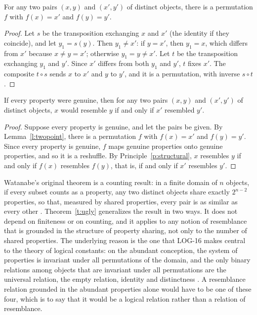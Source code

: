 \documentclass{situationist-preprint}
\begin{document}
\begin{lemma}\label{l:twopoint}
For any two pairs $(x,y)$ and $(x',y')$ of distinct objects, there is a permutation $f$ with $f(x) = x'$ and $f(y) = y'$.
\end{lemma}

\begin{proof}
Let $s$ be the transposition exchanging $x$ and $x'$ (the identity if they coincide), and let $y_1 = s(y)$. Then $y_1 \neq x'$: if $y = x'$, then $y_1 = x$, which differs from $x'$ because $x \neq y = x'$; otherwise $y_1 = y \neq x'$. Let $t$ be the transposition exchanging $y_1$ and $y'$. Since $x'$ differs from both $y_1$ and $y'$, $t$ fixes $x'$. The composite $t \circ s$ sends $x$ to $x'$ and $y$ to $y'$, and it is a permutation, with inverse $s \circ t$.
\end{proof}

\begin{theorem}\label{t:ugly}
If every property were genuine, then for any two pairs $(x,y)$ and $(x',y')$ of distinct objects, $x$ would resemble $y$ if and only if $x'$ resembled $y'$.
\end{theorem}

\begin{proof}
Suppose every property is genuine, and let the pairs be given. By Lemma~\ref{l:twopoint}, there is a permutation $f$ with $f(x) = x'$ and $f(y) = y'$. Since every property is genuine, $f$ maps genuine properties onto genuine properties, and so it is a reshuffle. By Principle~\ref{p:structural}, $x$ resembles $y$ if and only if $f(x)$ resembles $f(y)$, that is, if and only if $x'$ resembles $y'$.
\end{proof}

Watanabe's original theorem is a counting result: in a finite domain of $n$ objects, if every subset counts as a property, any two distinct objects share exactly $2^{n-2}$ properties, so that, measured by shared properties, every pair is as similar as every other \citep{Watanabe1969}. Theorem~\ref{t:ugly} generalizes the result in two ways. It does not depend on finiteness or on counting, and it applies to any notion of resemblance that is grounded in the structure of property sharing, not only to the number of shared properties. The underlying reason is the one that LOG-16 makes central to the theory of logical constants: on the abundant conception, the system of properties is invariant under all permutations of the domain, and the only binary relations among objects that are invariant under all permutations are the universal relation, the empty relation, identity and distinctness \citep{Tarski1986}. A resemblance relation grounded in the abundant properties alone would have to be one of these four, which is to say that it would be a logical relation rather than a relation of resemblance.
\end{document}

